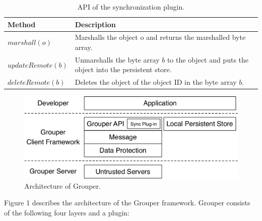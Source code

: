 \documentclass[sigconf]{acmart}
\begin{document}
\begin{table}[t]
	\centering
	\small
	\caption{API of the synchronization plugin.}
	\begin{tabular}{ll}
		\hline
		\textbf{Method} & \textbf{Description} \\ \hline
		$marshall(o)$ & Marshalls the object o and returns the marshalled byte array. \\
		$updateRemote(b)$ & Unmarshalls the byte array $b$ to the object and puts the object into the persistent store. \\ 
		$deleteRemote(b)$ & Deletes the object of the object ID in the byte array $b$.\\ \hline
	\end{tabular}
\end{table}

\begin{figure}[t]
	\centering
	\includegraphics[scale=0.45]{architecture}
	\caption{Architecture of Grouper.}
\end{figure}

Figure 1 describes the architecture of the Grouper framework. 
Grouper consists of the following four layers and a plugin:
\end{document}
